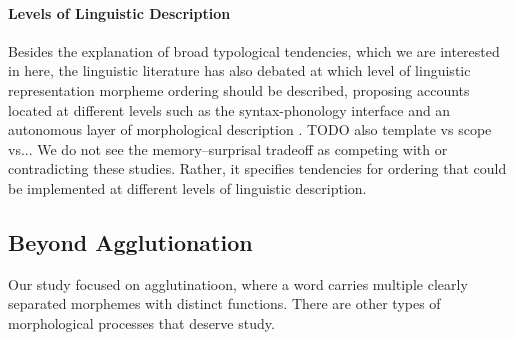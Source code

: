 \documentclass[11pt,letterpaper]{article}
\begin{document}
\paragraph{Levels of Linguistic Description}
Besides the explanation of broad typological tendencies, which we are interested in here, the linguistic literature has also debated at which level of linguistic representation morpheme ordering should be described, proposing accounts located at different levels such as the syntax-phonology interface \citep{baker1985the} and an autonomous layer of morphological description \citep{hyman2003suffix}.
TODO also template vs scope vs...
We do not see the memory--surprisal tradeoff as competing with or contradicting these studies.
Rather, it specifies tendencies for ordering that could be implemented at different levels of linguistic description.








\subsection{Beyond Agglutionation}

Our study focused on agglutinatioon, where a word carries multiple clearly separated morphemes with distinct functions.
There are other types of morphological processes that deserve study.
\end{document}
